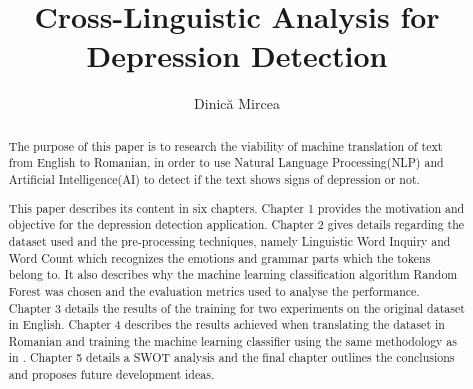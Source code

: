 \documentclass[3p,times,procedia]{elsarticle}
\begin{document}
\begin{frontmatter}



%


\title{\textbf{Cross-Linguistic Analysis for Depression Detection}}




\author{Dinică Mircea} 

\address{Department of Computer Science, Babe\c s-Bolyai University\\1, M. Kogalniceanu Street, 400084, Cluj-Napoca, Romania\\E-mail: .....}

\begin{abstract}
\quad The purpose of this paper is to research the viability of machine translation of text from English to Romanian, in order to use Natural Language Processing(NLP) and Artificial Intelligence(AI) to detect if the text shows signs of depression or not. 

This paper describes its content in six chapters. Chapter 1 provides the motivation and objective for the depression detection application. Chapter 2 gives details regarding the dataset used and the pre-processing techniques, namely Linguistic Word Inquiry and Word Count which recognizes the emotions and grammar parts which the tokens belong to. It also describes why the machine learning classification algorithm Random Forest was chosen and the evaluation metrics used to analyse the performance. Chapter 3 details the results of the training for two experiments on the original dataset in English. Chapter 4 describes the results achieved when translating the dataset in Romanian and training the machine learning classifier using the same methodology as in . Chapter 5 details a SWOT analysis and the final chapter outlines the conclusions and proposes future development ideas. 


\end{abstract}
\end{frontmatter}
\end{document}
